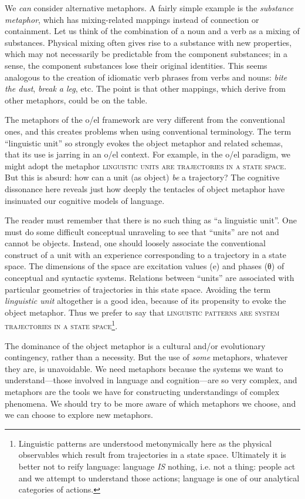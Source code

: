   We \textit{can} consider alternative metaphors. A fairly simple example is the \textit{substance metaphor}, which has mixing-related mappings instead of connection or containment. Let us think of the combination of a noun and a verb as a mixing of substances. Physical mixing often gives rise to a substance with new properties, which may not necessarily be predictable from the component substances; in a sense, the component substances lose their original identities. This seems analogous to the creation of idiomatic verb phrases from verbs and nouns: \textit{bite the dust}, \textit{break a leg}, etc. The point is that other mappings, which derive from other metaphors, could be on the table.

  The metaphors of the o/el framework are very different from the conventional ones, and this creates problems when using conventional terminology. The term “linguistic unit” so strongly evokes the object metaphor and related schemas, that its use is jarring in an o/el context. For example, in the o/el paradigm, we might adopt the metaphor \textsc{linguistic units are trajectories in a state space}. But this is absurd: how can a unit (as object) \textit{be} a trajectory? The cognitive dissonance here reveals just how deeply the tentacles of object metaphor have insinuated our cognitive models of language.

  The reader must remember that there is no such thing as “a linguistic unit”. One must do some difficult conceptual unraveling to see that “units” are not and cannot be objects. Instead, one should loosely associate the conventional construct of a unit with an experience corresponding to a trajectory in a state space. The dimensions of the space are excitation values (e) and phases (θ) of conceptual and syntactic systems. Relations between “units” are associated with particular geometries of trajectories in this state space. Avoiding the term \textit{linguistic unit} altogether is a good idea, because of its propensity to evoke the object metaphor. Thus we prefer to say that \textsc{linguistic patterns are system trajectories in a state space}\footnote{Linguistic patterns are understood metonymically here as the physical observables which result from trajectories in a state space. Ultimately it is better not to reify language: language \textit{IS} nothing, i.e. not a thing: people act and we attempt to understand those actions; language is one of our analytical categories of actions.}.

  The dominance of the object metaphor is a cultural and/or evolutionary contingency, rather than a necessity. But the use of \textit{some} metaphors, whatever they are, is unavoidable. We need metaphors because the systems we want to understand—those involved in language and cognition—are so very complex, and metaphors are the tools we have for constructing understandings of complex phenomena. We should try to be more aware of which metaphors we choose, and we can choose to explore new metaphors.

